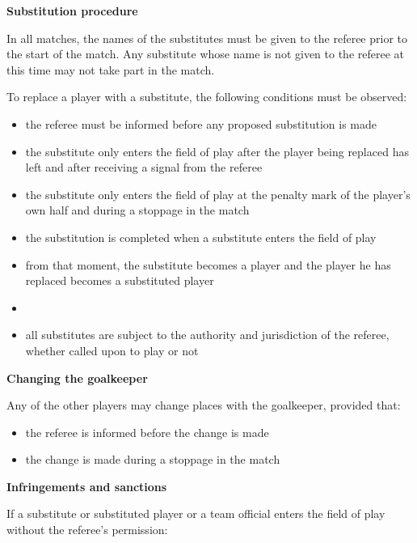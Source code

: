 {\bfseries Substitution procedure}

\headlinebox

In all matches, the names of the substitutes must be given to the referee prior to the start of the match. Any substitute whose name is not given to the referee at this time may not take part in the match.

\bigskip

To replace a player with a substitute, the following conditions must be observed:

\begin{itemize}
\item the referee must be informed before any proposed substitution is made
\item the substitute only enters the field of play after the player being replaced has left and after receiving a signal from the referee
\item the substitute only enters the field of play at the penalty mark of the player's own half  and during a stoppage in the match 
\item the substitution is completed when a substitute enters the field of play
\item from that moment, the substitute becomes a player and the player he has replaced becomes a substituted player 
\item {}
\item all substitutes are subject to the authority and jurisdiction of the referee, whether called upon to play or not
\end{itemize}

{\bfseries Changing the goalkeeper}

\headlinebox

Any of the other players may change places with the goalkeeper, provided that:

\begin{itemize}
\item the referee is informed before the change is made
\item the change is made during a stoppage in the match
\end{itemize}

{\bfseries Infringements and sanctions}

\headlinebox

If a substitute or substituted player or a team official enters the field of play
without the referee's permission:

